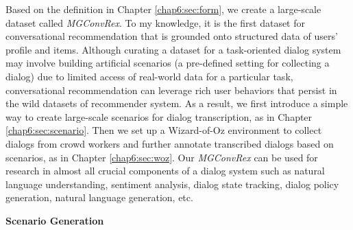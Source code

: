 Based on the definition in Chapter \ref{chap6:sec:form}, we create a large-scale dataset called \textit{MGConvRex}.
To my knowledge, it is the first dataset for conversational recommendation that is grounded onto structured data of users' profile and items.
Although curating a dataset for a task-oriented dialog system may involve building artificial scenarios (a pre-defined setting for collecting a dialog) \cite{li2016user,li2018microsoft} due to limited access of real-world data for a particular task, conversational recommendation can leverage rich user behaviors that persist in the wild datasets of recommender system.  
As a result, we first introduce a simple way to create large-scale scenarios for dialog transcription, as in Chapter \ref{chap6:sec:scenario}.
Then we set up a Wizard-of-Oz environment \cite{dstc2,woz,multiwoz,multiwoz2.1} to collect dialogs from crowd workers and further annotate transcribed dialogs based on scenarios, as in Chapter \ref{chap6:sec:woz}.
Our \textit{MGConvRex} can be used for research in almost all crucial components of a dialog system such as natural language understanding, sentiment analysis, dialog state tracking, dialog policy generation, natural language generation, etc.

\textbf{Scenario Generation}
\label{chap6:sec:scenario}

